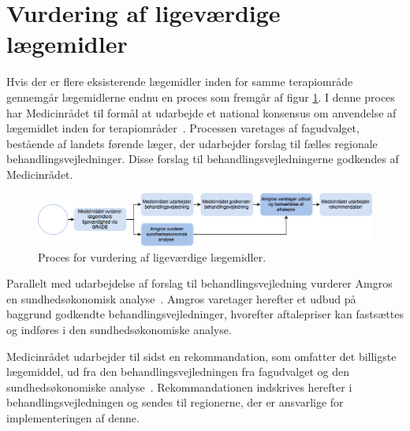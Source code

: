 \section{Vurdering af ligeværdige lægemidler}
Hvis der er flere eksisterende lægemidler inden for samme terapiområde gennemgår lægemidlerne endnu en proces som fremgår af figur \ref{fig:Udbud1}. I denne proces har Medicinrådet til formål at udarbejde et national konsensus om anvendelse af lægemidlet inden for terapiområder~\citep{DanskeRegioner2016}. Processen varetages af fagudvalget, bestående af landets førende læger, der udarbejder forslag til fælles regionale behandlingsvejledninger. Disse forslag til behandlingsvejledningerne godkendes af Medicinrådet.~\citep{DanskeRegioner2016}

\begin{figure}[H]\centering
	\includegraphics[width=1\textwidth]{billeder/Udbud1.png} 
	\caption{Proces for vurdering af ligeværdige lægemidler.~\citep{DanskeRegioner2016}}
	\label{fig:Udbud1}  
\end{figure}

Parallelt med udarbejdelse af forslag til behandlingsvejledning vurderer Amgros en sundhedsøkonomisk analyse~\citep{DanskeRegioner2016}. Amgros varetager herefter et udbud på baggrund godkendte  behandlingsvejledninger, hvorefter aftalepriser kan fastsættes og indføres i den sundhedsøkonomiske analyse.~\citep{DanskeRegioner2016}

Medicinrådet udarbejder til sidst en rekommandation, som omfatter det billigste lægemiddel, ud fra den behandlingsvejledningen fra fagudvalget og den sundhedsøkonomiske analyse~\citep{DanskeRegioner2016}. Rekommandationen indskrives herefter i behandlingsvejledningen og sendes til regionerne, der er ansvarlige for implementeringen af denne.~\citep{DanskeRegioner2016}
